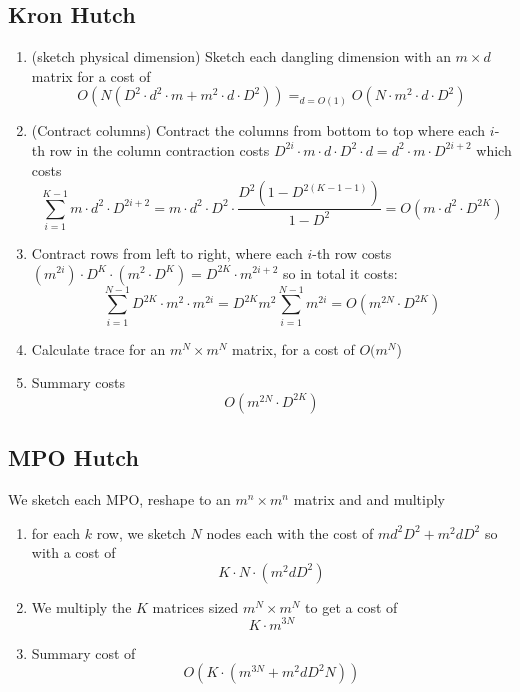 \documentclass[12pt]{article}
\begin{document}
\subsection{Kron Hutch}
\begin{enumerate}
    \item (sketch physical dimension) Sketch each dangling dimension with an $m\times d$  matrix for a cost of $$O(N(D^2\cdot d^2\cdot m+m^2\cdot d\cdot D^2))=_{d=O(1)}O(N\cdot m^2\cdot d\cdot D^2)$$ 
    \item (Contract columns) Contract the columns from bottom to top where each $i$-th row in the column contraction costs $D^{2i} \cdot m\cdot d\cdot D^2\cdot d=d^2\cdot m \cdot D^{2i+2} $  which costs $$\sum_{i=1}^{K-1} m\cdot d^2\cdot D^{2i+2}=m\cdot d^2\cdot D^2\cdot \frac{D^2(1-D^{2(K-1-1)})}{1-D^2}=O(m\cdot d^2\cdot D^{2K}) $$ 
    \item Contract rows from left to right, where each $i$-th row costs $(m^{2i})\cdot D^K\cdot (m^2\cdot D^K)=D^{2K}\cdot m^{2i+2}$  so in total it costs: $$\sum_{i=1}^{N-1}D^{2K}\cdot m^2 \cdot m^{2i}=D^{2K}m^2\sum_{i=1}^{N-1}m^{2i}=O(m^{2N}\cdot D^{2K})$$  
    \item Calculate trace for an $m^N\times m^N$  matrix, for a cost of $O(m^N$) 

\item Summary costs $$O(m^{2N}\cdot D^{2K})$$
\end{enumerate}

\subsection{MPO Hutch}
 We sketch each MPO, reshape to an $m^n\times m^n$  matrix and and multiply
\begin{enumerate}
    \item for each $k$  row, we sketch $N$  nodes each with the cost of $md^2D^2 + m^2dD^2$  so with a cost of $$K\cdot N\cdot (m^2dD^2)$$
    \item  We multiply the $K$  matrices sized $m^N\times m^N$  to get a cost of $$K\cdot m^{3N}$$
    \item Summary cost of $$O(K\cdot (m^{3N} +m^2dD^2N))$$
\end{enumerate}
\end{document}
